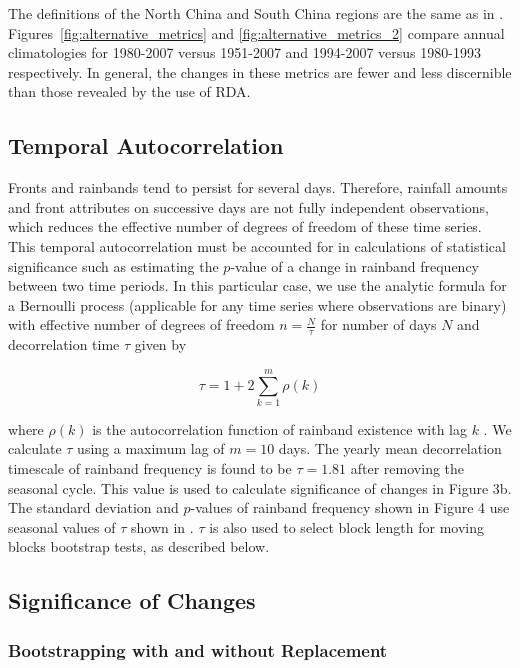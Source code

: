 \documentclass[singlecolumn,11pt]{pnas-new}
\begin{document}
 The definitions of the North China and South China regions are the same as in \cite{Yu2010}. Figures~\ref{fig:alternative_metrics} and \ref{fig:alternative_metrics_2} compare annual climatologies for 1980-2007 versus 1951-2007 and 1994-2007 versus 1980-1993 respectively. In general, the changes in these metrics are fewer and less discernible than those revealed by the use of RDA.
 
 \subsection{Temporal Autocorrelation}

	Fronts and rainbands tend to persist for several days. Therefore, rainfall amounts and front attributes on successive days are not fully independent observations, which reduces the effective number of degrees of freedom of these time series. This temporal autocorrelation must be accounted for in calculations of statistical significance such as estimating the $p$-value of a change in rainband frequency between two time periods. In this particular case, we use the analytic formula for a Bernoulli process (applicable for any time series where observations are binary) with effective number of degrees of freedom $n=\frac{N}{\tau}$ for number of days $N$ and decorrelation time $\tau$ given by

\begin{equation*}
\tau=1+2\sum_{k=1}^m \rho(k)
\end{equation*}

	where $\rho(k)$ is the autocorrelation function of rainband existence with lag $k$ \citep{VonStorch1999}. We calculate $\tau$ using a maximum lag of $m=10$ days. The yearly mean decorrelation timescale of rainband frequency is found to be $\tau = 1.81$ after removing the seasonal cycle. This value is used to calculate significance of changes in Figure 3b. The standard deviation and $p$-values of rainband frequency shown in Figure 4 use seasonal values of $\tau$ shown in \cite{Day2016}. $\tau$ is also used to select block length for moving blocks bootstrap tests, as described below.
 
\subsection{Significance of Changes}

\subsubsection{Bootstrapping with and without Replacement}
\end{document}
